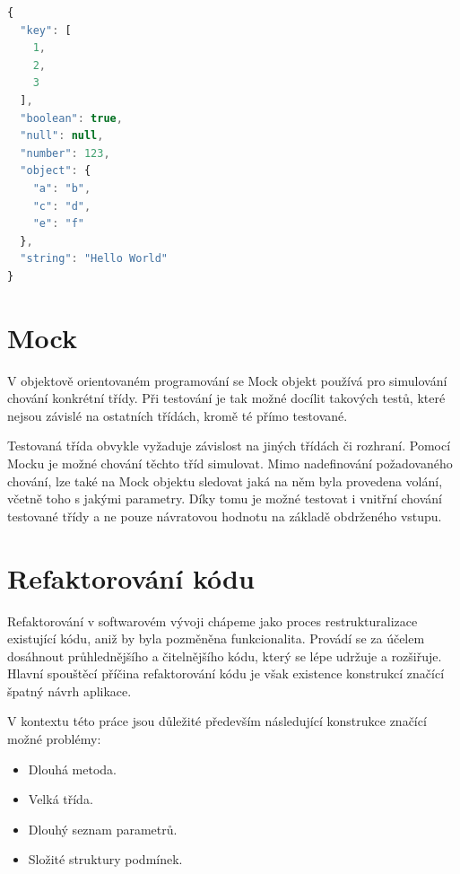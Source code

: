 \documentclass[thesis=B,czech]{FITthesis}[2012/06/26]
\begin{document}
\begin{lstlisting}[language=JavaScript, caption={Ukázka formátu JSON}]
{
  "key": [
    1,
    2,
    3
  ],
  "boolean": true,
  "null": null,
  "number": 123,
  "object": {
    "a": "b",
    "c": "d",
    "e": "f"
  },
  "string": "Hello World"
}
\end{lstlisting}

\section{Mock}
V objektově orientovaném programování se Mock objekt používá pro simulování chování konkrétní třídy.\cite{mock}
Při testování je tak možné docílit takových testů, které nejsou závislé na ostatních třídách, kromě té přímo testované.
\par
Testovaná třída obvykle vyžaduje závislost na jiných třídách či rozhraní. Pomocí Mocku je možné chování těchto tříd simulovat.
Mimo nadefinování požadovaného chování, lze také na Mock objektu sledovat jaká na něm byla provedena volání, včetně toho
s jakými parametry. Díky tomu je možné testovat i vnitřní chování testované třídy a ne pouze návratovou hodnotu na základě 
obdrženého vstupu.\cite{mock}

\section{Refaktorování kódu}
Refaktorování v softwarovém vývoji chápeme jako proces restrukturalizace existující kódu, aniž by byla 
pozměněna funkcionalita. Provádí se za účelem dosáhnout průhlednějšího a čitelnějšího kódu, který
se lépe udržuje a rozšiřuje.\cite{refaktoring} Hlavní spouštěcí příčina refaktorování kódu je však existence 
konstrukcí značící špatný návrh aplikace. 

V kontextu této práce jsou důležité především následující konstrukce značící možné problémy\cite{refaktoring}:  
\begin{itemize}
\item Dlouhá metoda.
\item Velká třída.
\item Dlouhý seznam parametrů.
\item Složité struktury podmínek.
\end{itemize}
\end{document}
